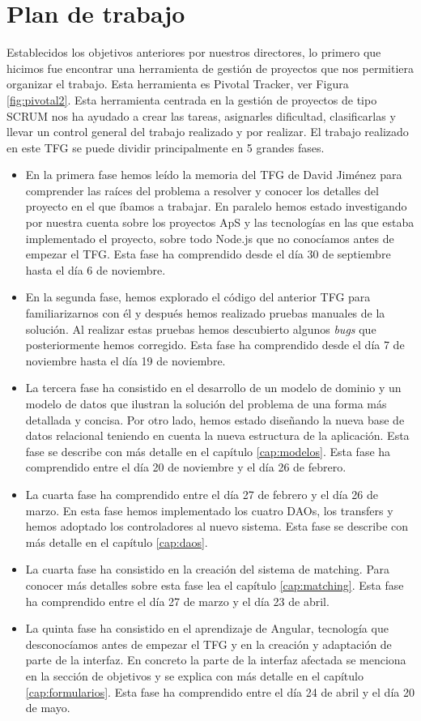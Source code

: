 \documentclass[11pt]{book}
\begin{document}
\section{Plan de trabajo}
Establecidos los objetivos anteriores por nuestros directores, lo primero que hicimos fue encontrar una herramienta de gestión de proyectos que nos permitiera organizar el trabajo. Esta herramienta es Pivotal Tracker, ver Figura \ref{fig:pivotal2}. Esta herramienta centrada en la gestión de proyectos de tipo SCRUM nos ha ayudado a crear las tareas, asignarles dificultad, clasificarlas y llevar un control general del trabajo realizado y por realizar. El trabajo realizado en este TFG se puede dividir principalmente en 5 grandes fases.
\begin{itemize} 
	\item En la primera fase hemos leído la memoria del TFG de David Jiménez para comprender las raíces del problema a resolver y conocer los detalles del proyecto en el que íbamos a trabajar. En paralelo hemos estado investigando por nuestra cuenta sobre los proyectos ApS y las tecnologías en las que estaba implementado el proyecto, sobre todo Node.js que no conocíamos antes de empezar el TFG. Esta fase ha comprendido desde el día 30 de septiembre hasta el día 6 de noviembre.
	\item En la segunda fase, hemos explorado el código del anterior TFG para familiarizarnos con él y después hemos realizado pruebas manuales de la solución. Al realizar estas pruebas hemos descubierto algunos \textit{bugs} que posteriormente hemos corregido. Esta fase ha comprendido desde el día 7 de noviembre hasta el día 19 de noviembre.
	\item La tercera fase ha consistido en el desarrollo de un modelo de dominio y un modelo de datos que ilustran la solución del problema de una forma más detallada y concisa. Por otro lado, hemos estado diseñando la nueva base de datos relacional teniendo en cuenta la nueva estructura de la aplicación. Esta fase se describe con más detalle en el capítulo \ref{cap:modelos}. Esta fase ha comprendido entre el día 20 de noviembre y el día 26 de febrero.
	\item La cuarta fase ha comprendido entre el día 27 de febrero y  el día 26 de marzo. En esta fase hemos implementado los cuatro DAOs, los transfers y hemos adoptado los controladores al nuevo sistema. Esta fase se describe con más detalle en el capítulo \ref{cap:daos}.
	\item La cuarta fase ha consistido en la creación del sistema de matching. Para conocer más detalles sobre esta fase lea el capítulo \ref{cap:matching}. Esta fase ha comprendido entre el día 27 de marzo y el día 23 de abril.
	\item La quinta fase ha consistido en el aprendizaje de Angular, tecnología que desconocíamos antes de empezar el TFG y en la creación y adaptación de parte de la interfaz. En concreto la parte de la interfaz afectada se menciona en la sección de objetivos y se explica con más detalle en el capítulo \ref{cap:formularios}. Esta fase ha comprendido entre el día 24 de abril y el día 20 de mayo.

\end{itemize}
\end{document}
